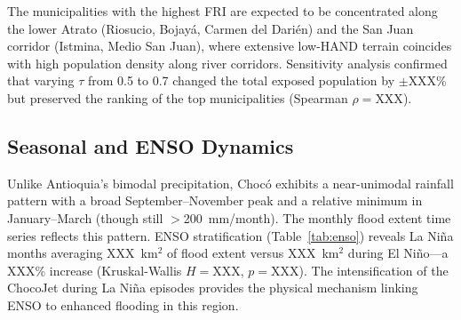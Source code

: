 \documentclass{article}
\begin{document}

The municipalities with the highest FRI are expected to be concentrated along the lower Atrato (Riosucio, Bojay\'a, Carmen del Dari\'en) and the San Juan corridor (Istmina, Medio San Juan), where extensive low-HAND terrain coincides with high population density along river corridors. Sensitivity analysis confirmed that varying $\tau$ from 0.5 to 0.7 changed the total exposed population by $\pm$XXX\% but preserved the ranking of the top municipalities (Spearman $\rho = \text{XXX}$).

\subsection{Seasonal and ENSO Dynamics}


Unlike Antioquia's bimodal precipitation, Choc\'o exhibits a near-unimodal rainfall pattern with a broad September--November peak and a relative minimum in January--March (though still $>$200~mm/month). The monthly flood extent time series reflects this pattern. ENSO stratification (Table~\ref{tab:enso}) reveals La Ni\~na months averaging XXX~km$^2$ of flood extent versus XXX~km$^2$ during El Ni\~no---a XXX\% increase (Kruskal-Wallis $H = \text{XXX}$, $p = \text{XXX}$). The intensification of the ChocoJet during La Ni\~na episodes \citep{Poveda2023, Salas2023} provides the physical mechanism linking ENSO to enhanced flooding in this region.
\end{document}
